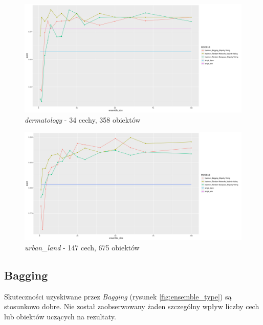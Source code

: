 \documentclass[11pt, a4paper, titlepage]{report}
\begin{document}
\begin{figure}[H]
	\includegraphics[width=1.0\textwidth]{type4_primary_task_dataset_dermatology}
    \centering
    \caption{\textit{dermatology} - 34 cechy, 358 obiektów}
    \label{fig:randomsub_dermatology}
\end{figure}

\begin{figure}[H]
	\includegraphics[width=1.0\textwidth]{type4_primary_task_dataset_urban_land_cover}
    \centering
    \caption{\textit{urban\_land} - 147 cech, 675 obiektów}
    \label{fig:randomsub_urban_land_cover}
\end{figure}

\subsection{Bagging}

Skuteczności uzyskiwane przez \textit{Bagging} (rysunek \ref{fig:ensemble_type}) są stosunkowo dobre. Nie został zaobserwowany żaden szczególny wpływ liczby cech lub obiektów uczących na rezultaty.
\end{document}
